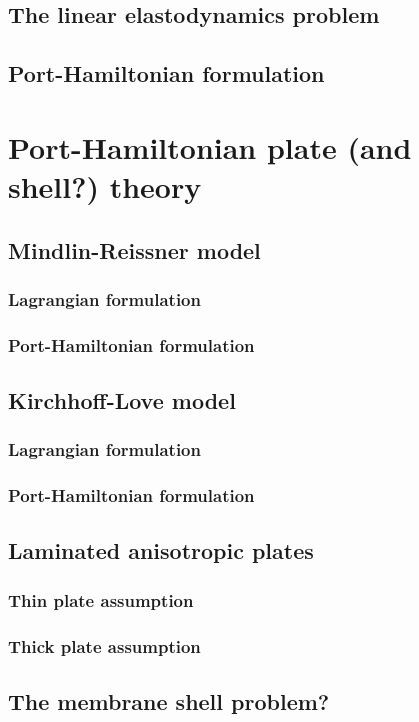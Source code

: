 \documentclass[a4paper,11pt]{book}
\begin{document}
\section{The linear elastodynamics problem}
\section{Port-Hamiltonian formulation}

\chapter{Port-Hamiltonian plate (and shell?) theory}
\section{Mindlin-Reissner model}
\subsection{Lagrangian formulation}
\subsection{Port-Hamiltonian formulation}
\section{Kirchhoff-Love model}
\subsection{Lagrangian formulation}
\subsection{Port-Hamiltonian formulation}

\section{Laminated anisotropic plates}
\subsection{Thin plate assumption}
\subsection{Thick plate assumption}

\section{The membrane shell problem?}
\end{document}
